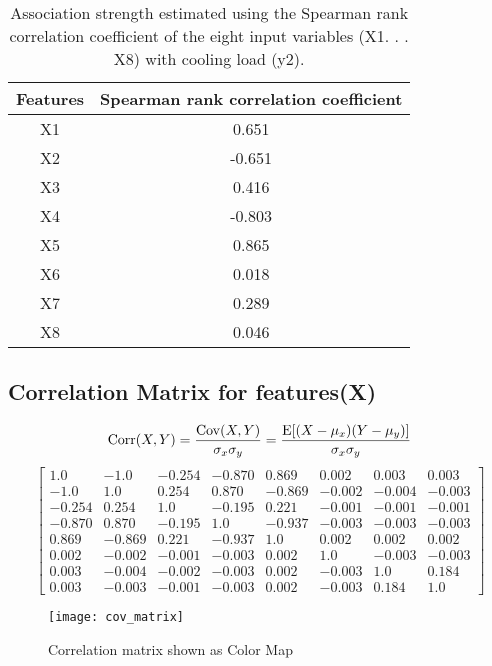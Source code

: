     \begin{table}[h!]
          \centering
          \caption{Association strength estimated using the Spearman rank correlation coefficient of the eight input variables (X1. . . X8) with cooling load (y2).}
          \label{tab:sprcoeffcl}
          \begin{tabular}{c|c}
            Features & Spearman rank correlation coefficient\\
            \hline
            X1 & 0.651 \\
            \hline
            X2 & -0.651 \\
            \hline
            X3 & 0.416 \\
            \hline
            X4 & -0.803 \\
            \hline
            X5 & 0.865 \\
            \hline
            X6 & 0.018 \\
            \hline
            X7 & 0.289 \\
            \hline
            X8 & 0.046 \\
            \hline
          \end{tabular}
    \end{table}
    \subsection{Correlation Matrix for features(X)}
          \begin{equation}
            \mathrm{Corr}(X, Y) = \frac{\mathrm{Cov}(X, Y)}{\sigma_{x}\sigma_{y}} = \frac{\mathrm{E}[(X-\mu_{x})(Y-\mu_{y})]}{\sigma_{x}\sigma_{y}}  
          \end{equation}
          \newline
          \begin{equation}
            \left[
              \begin{matrix}
                  1.0 & -1.0 & -0.254 & -0.870 & 0.869 & 0.002 & 0.003 & 0.003\\
-1.0 & 1.0 & 0.254 & 0.870 & -0.869 & -0.002 & -0.004 & -0.003\\
-0.254 & 0.254 & 1.0 & -0.195 & 0.221 & -0.001 & -0.001 & -0.001\\
-0.870 & 0.870 & -0.195 & 1.0 & -0.937 & -0.003 & -0.003 & -0.003\\
0.869 & -0.869 & 0.221 & -0.937 & 1.0 & 0.002 & 0.002 & 0.002\\
0.002 & -0.002 & -0.001 & -0.003 & 0.002 & 1.0 & -0.003 & -0.003\\
0.003 & -0.004 & -0.002 & -0.003 & 0.002 & -0.003 & 1.0 & 0.184\\
0.003 & -0.003 & -0.001 & -0.003 & 0.002 & -0.003 & 0.184 & 1.0
              \end{matrix}
            \right]
    \end{equation}
    \begin{figure}[htbp]
      \hspace*{-6.1cm}
      \texttt{[image: cov\_matrix]}
      \caption{Correlation matrix shown as Color Map}
      \label{fig:cov_matrix}
    \end{figure}
    \newpage  
